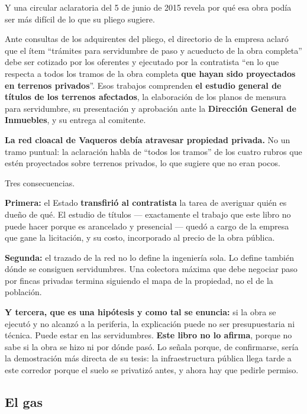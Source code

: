 \begin{cautela}
Y una circular aclaratoria del 5 de junio de 2015 revela por qué esa obra podía ser más difícil de lo que su pliego sugiere.

Ante consultas de los adquirentes del pliego, el directorio de la empresa aclaró que el ítem ``trámites para servidumbre de paso y acueducto de la obra completa'' debe ser cotizado por los oferentes y ejecutado por la contratista ``en lo que respecta a todos los tramos de la obra completa \textbf{que hayan sido proyectados en terrenos privados}''. Esos trabajos comprenden \textbf{el estudio general de títulos de los terrenos afectados}, la elaboración de los planos de mensura para servidumbre, su presentación y aprobación ante la \textbf{Dirección General de Inmuebles}, y su entrega al comitente.

\textbf{La red cloacal de Vaqueros debía atravesar propiedad privada.} No un tramo puntual: la aclaración habla de ``todos los tramos'' de los cuatro rubros que estén proyectados sobre terrenos privados, lo que sugiere que no eran pocos.

Tres consecuencias.

\textbf{Primera:} el Estado \textbf{transfirió al contratista} la tarea de averiguar quién es dueño de qué. El estudio de títulos --- exactamente el trabajo que este libro no puede hacer porque es arancelado y presencial --- quedó a cargo de la empresa que gane la licitación, y su costo, incorporado al precio de la obra pública.

\textbf{Segunda:} el trazado de la red no lo define la ingeniería sola. Lo define también dónde se consiguen servidumbres. Una colectora máxima que debe negociar paso por fincas privadas termina siguiendo el mapa de la propiedad, no el de la población.

\textbf{Y tercera, que es una hipótesis y como tal se enuncia:} si la obra se ejecutó y no alcanzó a la periferia, la explicación puede no ser presupuestaria ni técnica. Puede estar en las servidumbres. \textbf{Este libro no lo afirma}, porque no sabe si la obra se hizo ni por dónde pasó. Lo señala porque, de confirmarse, sería la demostración más directa de su tesis: la infraestructura pública llega tarde a este corredor porque el suelo se privatizó antes, y ahora hay que pedirle permiso.
\end{cautela}

\subsection*{El gas}

